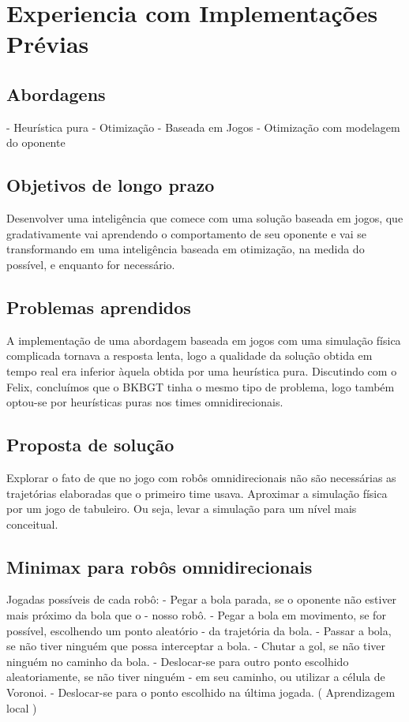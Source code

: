 \chapter{Experiencia com Implementações Prévias}

\section{Abordagens}
- Heurística pura
- Otimização
- Baseada em Jogos
- Otimização com modelagem do oponente

\section{Objetivos de longo prazo}
Desenvolver uma inteligência que comece com
uma solução baseada em jogos, que
gradativamente vai aprendendo o
comportamento de seu oponente e vai se
transformando em uma inteligência baseada
em otimização, na medida do possível, e
enquanto for necessário.

\section{Problemas aprendidos}
A implementação de uma abordagem baseada
em jogos com uma simulação física complicada
tornava a resposta lenta, logo a qualidade da
solução obtida em tempo real era inferior
àquela obtida por uma heurística pura.
Discutindo com o Felix, concluímos que o
BKBGT tinha o mesmo tipo de problema, logo
também optou-se por heurísticas puras nos
times omnidirecionais.

\section{Proposta de solução}
Explorar o fato de que no jogo com robôs
omnidirecionais não são necessárias as
trajetórias elaboradas que o primeiro time
usava.
Aproximar a simulação física por um jogo de
tabuleiro. Ou seja, levar a simulação para um
nível mais conceitual.

\section{Minimax para robôs omnidirecionais}
Jogadas possíveis de cada robô:
  - Pegar a bola parada, se o oponente não estiver mais próximo da bola que o
  - nosso robô.
  - Pegar a bola em movimento, se for possível, escolhendo um ponto aleatório
  - da trajetória da bola.
  - Passar a bola, se não tiver ninguém que possa interceptar a bola.
  - Chutar a gol, se não tiver ninguém no caminho da bola.
  - Deslocar-se para outro ponto escolhido aleatoriamente, se não tiver ninguém
  - em seu caminho, ou utilizar a célula de Voronoi.
  - Deslocar-se para o ponto escolhido na última jogada. ( Aprendizagem local )

